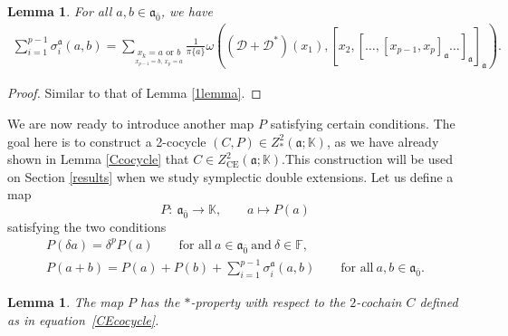 \documentclass[10pt,a4paper]{amsart}
\numberwithin{equation}{section}
\newtheorem{Lemma}[Theorem]{Lemma}
\begin{document}
\begin{Lemma} \label{sigmabra} For all $a,b\in \mathfrak{a}_{\bar 0}$, we have
\begin{gather*}
 \sum_{i=1}^{p-1}\sigma_i^{\mathfrak{a}}(a,b)=\sum_{\underset{x_{p-1}=b,~x_p=a}{x_k=a \text{ or } b}}\frac{1}{\pi\{a\}}\omega( ({\mathscr D}+{\mathscr D}^*)(x_1),[x_2,[\dots ,[x_{p-1},x_p]_{\mathfrak{a}}\dots ]_{\mathfrak{a}}]_{\mathfrak{a}} ).
\end{gather*}
\end{Lemma}
\begin{proof}
Similar to that of Lemma \ref{1lemma}.
\end{proof}
We are now ready to introduce another map $P$ satisfying certain conditions. The goal here is to construct a 2-cocycle $(C,P)\in Z^2_*(\mathfrak{a}; \mathbb K)$, as we have already shown in Lemma \ref{Ccocycle} that $C\in Z^2_{\text{CE}}(\mathfrak{a}; \mathbb K)$.This construction will be used on Section \ref{results} when we study symplectic double extensions. Let us define a map \begin{equation}
 \label{mapP} P\colon\ \mathfrak{a}_{\bar 0} \rightarrow \mathbb K, \qquad a\mapsto P(a)
 \end{equation}
satisfying the two conditions
\begin{gather}
P(\delta a) = \delta^p P(a)\qquad \text{for all}\ a \in \mathfrak{a}_{\bar 0}\ \text{and}\ \delta\in \mathbb F,\label{CondP1}\\
P(a+b) = P(a)+P(b)+ \sum_{i=1}^{p-1}\sigma_i^{\mathfrak{a}}(a,b) \qquad \text{for all} \ a, b \in \mathfrak{a}_{\bar 0}.\label{CondP2}
 \end{gather}

 \begin{Lemma} \label{*property}
The map $P$ has the $*$-property with respect to the $2$-cochain $C$ defined as in equation~\eqref{CEcocycle}.
\end{Lemma}
\end{document}
